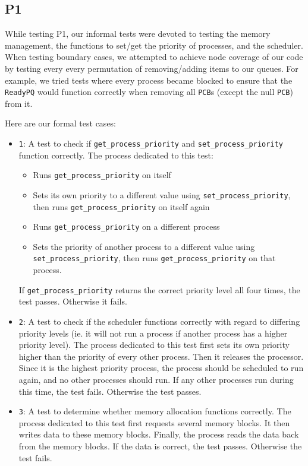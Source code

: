 \documentclass[12pt]{report}
\begin{document}
\subsection{P1}

While testing P1, our informal tests were devoted to testing the memory management, the functions to set/get the priority of processes, and the scheduler.  When testing boundary cases, we attempted to achieve node coverage of our code by testing every every permutation of removing/adding items to our queues.  For example, we tried tests where every process became blocked to ensure that the \texttt{ReadyPQ} would function correctly when removing all \texttt{PCB}s (except the null \texttt{PCB}) from it.

Here are our formal test cases:

\begin{itemize}
	\item \texttt{1}: A test to check if \texttt{get_process_priority} and \texttt{set_process_priority} function correctly.  The process dedicated to this test:
    	\begin{itemize}
			\item Runs \texttt{get_process_priority} on itself
            \item Sets its own priority to a different value using \texttt{set_process_priority}, then runs \texttt{get_process_priority} on itself again
            \item Runs \texttt{get_process_priority} on a different process
            \item Sets the priority of another process to a different value using \texttt{set_process_priority}, then runs \texttt{get_process_priority} on that process.
		\end{itemize}
    	If \texttt{get_process_priority} returns the correct priority level all four times, the test passes.  Otherwise it fails.
	\item \texttt{2}: A test to check if the scheduler functions correctly with regard to differing priority levels (ie. it will not run a process if another process has a higher priority level).  The process dedicated to this test first sets its own priority higher than the priority of every other process.  Then it releases the processor.  Since it is the highest priority process, the process should be scheduled to run again, and no other processes should run.  If any other processes run during this time, the test fails.  Otherwise the test passes.
	\item \texttt{3}: A test to determine whether memory allocation functions correctly.  The process dedicated to this test first requests several memory blocks.  It then writes data to these memory blocks.  Finally, the process reads the data back from the memory blocks.  If the data is correct, the test passes.  Otherwise the test fails.

\end{itemize}
\end{document}
